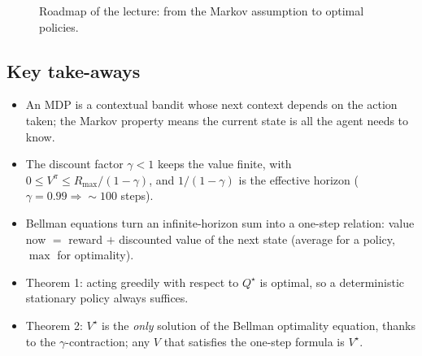 \documentclass[11pt,a4paper]{article}
\newcommand{\cS}{\mathcal{S}}
\newcommand{\cA}{\mathcal{A}}
\newcommand{\Rmax}{R_{\max}}
\theoremstyle{plain}
\theoremstyle{definition}
\theoremstyle{remark}
\begin{document}
\begin{figure}[htbp]
\centering
{}
\caption{Roadmap of the lecture: from the Markov assumption to optimal policies.}
\end{figure}

\subsection*{Key take-aways}
\begin{itemize}
  \item An MDP is a contextual bandit whose next context depends on the action taken; the Markov property means the current state is all the agent needs to know.
  \item The discount factor $\gamma<1$ keeps the value finite, with $0\le V^\pi\le\Rmax/(1-\gamma)$, and $1/(1-\gamma)$ is the effective horizon ($\gamma=0.99\Rightarrow{\sim}100$ steps).
  \item Bellman equations turn an infinite-horizon sum into a one-step relation: value now $=$ reward $+$ discounted value of the next state (average for a policy, $\max$ for optimality).
  \item Theorem 1: acting greedily with respect to $Q^\star$ is optimal, so a deterministic stationary policy always suffices.
  \item Theorem 2: $V^\star$ is the \emph{only} solution of the Bellman optimality equation, thanks to the $\gamma$-contraction; any $V$ that satisfies the one-step formula is $V^\star$.
\end{itemize}
\end{document}
